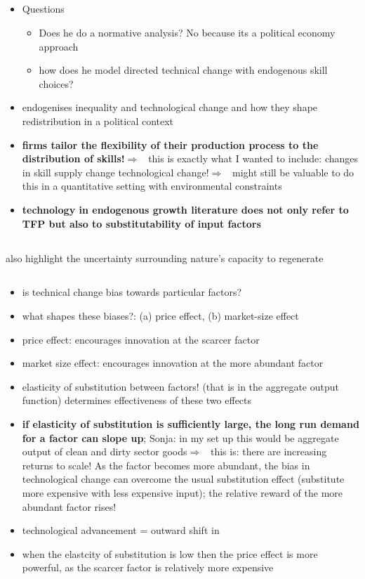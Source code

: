 \documentclass[12pt]{article}
\newcommand{\ar}{$\Rightarrow$ \ }
\begin{document}
\subsection{\cite{Benabou2005InequalityContract}}
\begin{itemize}
	\item Questions
	\begin{itemize}
	\item Does he do a normative analysis? No because its a political economy approach
	\item how does he model directed technical change with endogenous skill choices?
	\end{itemize}
	\item endogenises inequality and technological change and how they shape redistribution in a political context
	\item \textbf{firms tailor the flexibility of their production process to the distribution of skills!}\ar this is exactly what I wanted to include: changes in skill supply change technological change!\ar might still be valuable to do this in a quantitative setting with environmental constraints
	\item \textbf{technology in endogenous growth literature does not only refer to TFP but also to substitutability of input factors}
\end{itemize}
\subsection{\cite{Acemoglu2012TheChange}} also highlight the uncertainty surrounding nature's capacity to regenerate
\subsection{\cite{Acemoglu2002DirectedChange}}
\begin{itemize}
 \item is technical change bias towards particular factors? 
 \item what shapes these biases?: (a) price effect, (b) market-size effect
 \item price effect: encourages innovation at the scarcer factor
 \item market size effect: encourages innovation at the more abundant factor
 \item elasticity of substitution between factors! (that is in the aggregate output function) determines effectiveness of these two effects
 \item \textbf{if elasticity of substitution is sufficiently large, the long run demand for a factor can slope up}; Sonja: in my set up this would be aggregate output of clean and dirty sector goods\ar this is: there are increasing returns to scale! As the factor becomes more abundant, the bias in technological change can overcome the usual substitution effect (substitute more expensive with less expensive input); the relative reward of the more abundant factor rises! 
 \item technological advancement = outward shift in 
 \item when the elastcity of substitution is low then the price effect is more powerful, as the scarcer factor is relatively more expensive 
\end{itemize}
\end{document}
